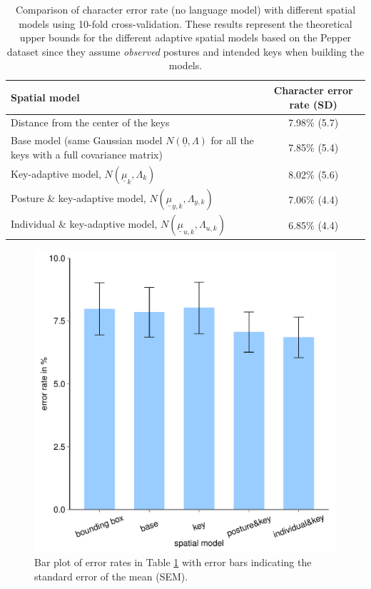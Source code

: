 \documentclass{sigchi}
\newcommand\tabhead[1]{\small\textbf{#1}}
\begin{document}
\begin{table} [tb]
  \centering
  \begin{tabular}{|l|c|}
    \hline
    \tabhead{Spatial model} &
    \multicolumn{1}{|p{0.2\columnwidth}|}{\centering\tabhead{Character
    error rate (SD)}} \\
    \hline
    Distance from the center of the keys & 7.98\% (5.7) \\
    \hline
    \multicolumn{1}{|p{0.7\columnwidth}|}{Base model (same Gaussian model $N(\underline 0, \Lambda)$ for
    all the keys with a full covariance matrix)} & 7.85\% (5.4) \\
    \hline
    \multicolumn{1}{|p{0.7\columnwidth}|}{Key-adaptive model, $N(\underline
    \mu_k, \Lambda_k)$} & 8.02\% (5.6) \\
    \hline
    \multicolumn{1}{|p{0.7\columnwidth}|}{Posture \& key-adaptive model,
    $N(\underline \mu_{y,k}, \Lambda_{y,k})$} & 7.06\% (4.4) \\
    \hline
     \multicolumn{1}{|p{0.7\columnwidth}|}{Individual \& key-adaptive model,
     $N(\underline \mu_{u,k}, \Lambda_{u,k})$} & 6.85\% (4.4) \\
    \hline
  \end{tabular}
  \caption{Comparison of character error rate (no language model) with
  different spatial models using 10-fold cross-validation. These results
  represent the theoretical upper bounds for the different adaptive spatial models based on 
  the Pepper dataset since they assume \textit{observed} postures and intended
  keys when building the models.}
  \label{tab:comparison}
\end{table}

\begin{figure}[tb]
  \centering
  \includegraphics[width=1\columnwidth,
  height=0.7\columnwidth]{figures/error-rates-embed-font.pdf}
  \caption{Bar plot of error rates in Table \ref{tab:comparison} with error bars
  indicating the standard error of the mean (SEM).}
  \label{fig:error-bar1}
\end{figure}
\end{document}
